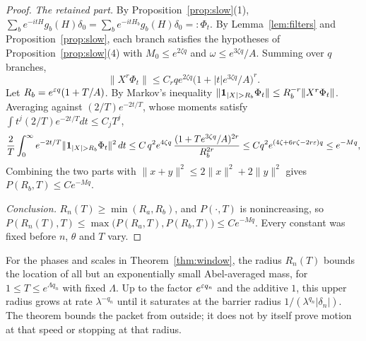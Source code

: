 \begin{proof}
\emph{The retained part.} By Proposition~\ref{prop:slow}(1), $\sum_be^{-itH}g_b(H)\delta_0=\sum_be^{-itH_b}g_b(H)\delta_0=:\Phi_t$. By Lemma~\ref{lem:filters} and Proposition~\ref{prop:slow}, each branch satisfies the hypotheses of Proposition~\ref{prop:slow}(4) with $M_0\le e^{2\zeta q}$ and $\omega\le e^{3\zeta q}/A$. Summing over $q$ branches,
\[
\|X^r\Phi_t\|\le C_rqe^{2\zeta q}\bigl(1+|t|e^{3\zeta q}/A\bigr)^r.
\]
Let $R_b=e^{\varepsilon q}(1+T/A)$. By Markov's inequality $\|\un_{|X|>R_b}\Phi_t\|\le R_b^{-r}\|X^r\Phi_t\|$. Averaging against $(2/T)e^{-2t/T}$, whose moments satisfy $\int t^{j}(2/T)e^{-2t/T}dt\le C_jT^j$,
\[
\frac2T\int_0^\infty e^{-2t/T}\|\un_{|X|>R_b}\Phi_t\|^2\,dt\le C\,q^2e^{4\zeta q}\,\frac{(1+Te^{3\zeta q}/A)^{2r}}{R_b^{2r}}\le Cq^2e^{(4\zeta+6r\zeta-2r\eps)q}\le e^{-Mq},
\]
Combining the two parts with $\|x+y\|^2\le2\|x\|^2+2\|y\|^2$ gives $P(R_b,T)\le Ce^{-Mq}$.

\emph{Conclusion.} $R_n(T)\ge\min(R_a,R_b)$, and $P(\cdot,T)$ is nonincreasing, so $P(R_n(T),T)\le\max\bigl(P(R_a,T),P(R_b,T)\bigr)\le Ce^{-Mq}$. Every constant was fixed before $n$, $\theta$ and $T$ vary.
\end{proof}

For the phases and scales in Theorem~\ref{thm:window}, the radius $R_n(T)$ bounds the location of all but an exponentially small Abel-averaged mass, for $1\le T\le e^{\Lambda q_n}$ with fixed $\Lambda$. Up to the factor $e^{\varepsilon q_n}$ and the additive $1$, this upper radius grows at rate $\lambda^{-q_n}$ until it saturates at the barrier radius $1/(\lambda^{q_n}|\delta_n|)$. The theorem bounds the packet from outside; it does not by itself prove motion at that speed or stopping at that radius.
